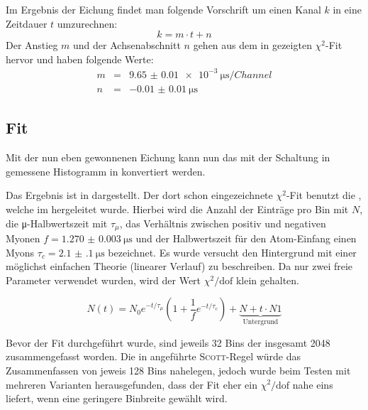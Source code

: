 Im Ergebnis der Eichung findet man folgende Vorschrift um einen Kanal $k$ in
eine Zeitdauer $t$ umzurechnen:
\begin{equation}
  k = m \cdot t + n
\end{equation}
Der Anstieg $m$ und der Achsenabschnitt $n$ gehen aus dem in 
gezeigten $\chi^2$-Fit hervor und haben folgende Werte:
\begin{eqnarray}
  m &=& \SI{9.65(1)e-3}{\micro\second\per{Channel}} \\
  n &=& \SI{-0.01(1)}{\micro\second}
\end{eqnarray}

\subsection{Fit}

Mit der nun eben gewonnenen Eichung kann nun das mit der Schaltung in
 gemessene Histogramm in  konvertiert werden.

Das Ergebnis ist in  dargestellt. Der dort schon eingezeichnete
$\chi^2$-Fit benutzt die , welche im \cite[Gl. 12]{script} hergeleitet wurde.
Hierbei wird die Anzahl der Einträge pro Bin mit $N$, die μ-Halbwertszeit mit
$τ_μ$, das Verhältnis zwischen positiv und negativen Myonen
$f = \SI{1.270(3)}{\micro\second}$ und der Halbwertszeit
für den Atom-Einfang einen Myons $τ_c = \SI{2.1(1)}{\micro\second}$ bezeichnet.
Es wurde versucht den Hintergrund mit einer möglichst einfachen Theorie
(linearer Verlauf) zu beschreiben. Da nur zwei freie Parameter verwendet wurden,
wird der Wert $\chi^2/\mbox{dof}$ klein gehalten.

\begin{equation}
  N(t) = N_0 e^{-t/τ_μ}\left(1+\frac{1}{f}e^{-t/τ_c}\right) + \underbrace{N+t\cdot N1}_{\mbox{Untergrund}}
  \label{eqn:fit}
\end{equation}

Bevor der Fit durchgeführt wurde, sind jeweils 32 Bins der insgesamt 2048
zusammengefasst worden. Die in \cite[Gl. 17]{script} angeführte \textsc{Scott}-Regel
würde das Zusammenfassen von jeweis 128 Bins nahelegen, jedoch wurde beim Testen
mit mehreren Varianten herausgefunden, dass der Fit eher ein  $\chi^2/\mbox{dof}$ nahe eins
liefert, wenn eine geringere Binbreite gewählt wird.

